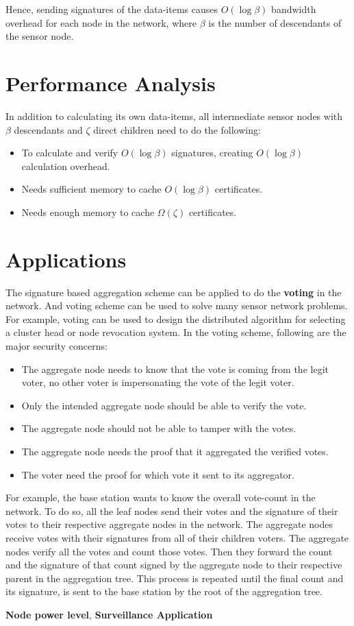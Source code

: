 	Hence, sending signatures of the data-items causes $O(\log \beta)$ bandwidth overhead for each node in the network, where $\beta$ is the number of descendants of the sensor node. 


\section{Performance Analysis}
	In addition to calculating its own data-items, all intermediate sensor nodes with $\beta$ descendants and $\zeta$ direct children need to do the following:
	\begin{itemize}
		\item To calculate and verify $O(\log \beta)$ signatures, creating $O(\log \beta)$ calculation overhead. 
		\item Needs sufficient memory to cache $O(\log \beta)$ certificates. 
		\item Needs enough memory to cache $\Omega(\zeta)$ certificates.
	\end{itemize}


\section{Applications}
		The signature based aggregation scheme can be applied to do the \textbf{voting} in the network.
		And voting scheme can be used to solve many sensor network problems.
		For example, voting can be used to design the distributed algorithm for selecting a cluster head or node revocation system.
		In the voting scheme, following are the major security concerns: 
		\begin{itemize}
			\item The aggregate node needs to know that the vote is coming from the legit voter, no other voter is impersonating the vote of the legit voter.
			\item Only the intended aggregate node should be able to verify the vote.
			\item The aggregate node should not be able to tamper with the votes. 
			\item The aggregate node needs the proof that it aggregated the verified votes.
			\item The voter need the proof for which vote it sent to its aggregator.
		\end{itemize}
		For example, the base station wants to know the overall vote-count in the network.
		To do so, all the leaf nodes send their votes and the signature of their votes to their respective aggregate nodes in the network.
		The aggregate nodes receive votes with their signatures from all of their children voters.
		The aggregate nodes verify all the votes and count those votes.
		Then they forward the count and the signature of that count signed by the aggregate node to their respective parent in the aggregation tree.
		This process is repeated until the final count and its signature, is sent to the base station by the root of the aggregation tree.
				
\textbf{Node power level},
\textbf{Surveillance Application}

